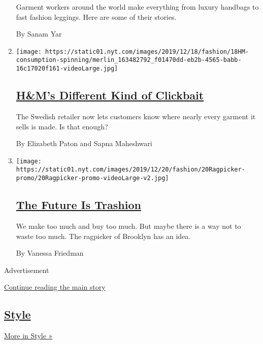 \begin{enumerate}
  Garment workers around the world make everything from luxury handbags
  to fast fashion leggings. Here are some of their stories.

  By Sanam Yar
\item
  \texttt{[image: https://static01.nyt.com/images/2019/12/18/fashion/18HM-consumption-spinning/merlin\_163482792\_f01470dd-eb2b-4565-babb-16c17020f161-videoLarge.jpg]}

  \hypertarget{hms-different-kind-of-clickbait}{%
  \subsection{\texorpdfstring{\href{/2019/12/18/fashion/hms-supply-chain-transparency.html}{H\&M's
  Different Kind of
  Clickbait}}{H\&M's Different Kind of Clickbait}}\label{hms-different-kind-of-clickbait}}

  The Swedish retailer now lets customers know where nearly every
  garment it sells is made. Is that enough?

  By Elizabeth Paton and Sapna Maheshwari
\item
  \texttt{[image: https://static01.nyt.com/images/2019/12/20/fashion/20Ragpicker-promo/20Ragpicker-promo-videoLarge-v2.jpg]}

  \hypertarget{the-future-is-trashion}{%
  \subsection{\texorpdfstring{\href{/2019/12/20/style/zero-waste-daniel-trashion.html}{The
  Future Is
  Trashion}}{The Future Is Trashion}}\label{the-future-is-trashion}}

  We make too much and buy too much. But maybe there is a way not to
  waste too much. The ragpicker of Brooklyn has an idea.

  By Vanessa Friedman
\end{enumerate}

Advertisement

\protect\hyperlink{after-mid3}{Continue reading the main story}

\hypertarget{style-1}{%
\subsection{\texorpdfstring{\href{/section/style}{Style}}{Style}}\label{style-1}}

\href{/section/style}{More in Style »}


